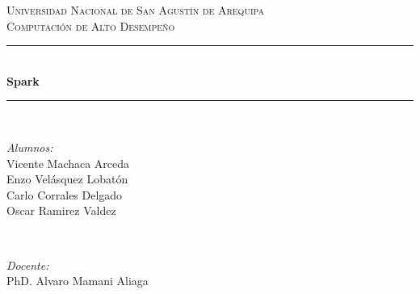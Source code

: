 \documentclass{article}
\newcommand{\csdocente}{Vicente Machaca Arceda \\ Enzo Velásquez Lobatón \\
	Carlo Corrales Delgado\\
	Oscar Ramirez Valdez
	}
\newcommand{\cscurso}{Computación de Alto Desempeño}
\newcommand{\csuniversidad}{Universidad Nacional de San Agustín de Arequipa}
\newcommand{\cstema}{Spark}
\begin{document}
	
	
	
	
\begin{titlepage}
	
	\newcommand{\HRule}{\rule{\linewidth}{0.5mm}} %
	
	\center %
	
	
	\textsc{\LARGE \csuniversidad}\\[1.5cm] %
	\textsc{\Large \cscurso}\\[0.5cm] %
	
	
	\vspace{2cm}
	
	\HRule \\[0.4cm]
	{ \huge \bfseries \cstema}\\[0.4cm] %
	\HRule \\[1.5cm]
	
	
	\begin{minipage}{0.4\textwidth}
		\begin{flushleft} \large
			\emph{Alumnos:}\\
			\csdocente
		\end{flushleft}
	\end{minipage}
	~
	\begin{minipage}{0.4\textwidth}
		\begin{flushright} \large
			\emph{Docente:} \\
			PhD. Alvaro Mamani Aliaga
		\end{flushright}
	\end{minipage}\\[2cm]
	

\end{titlepage}
\end{document}

